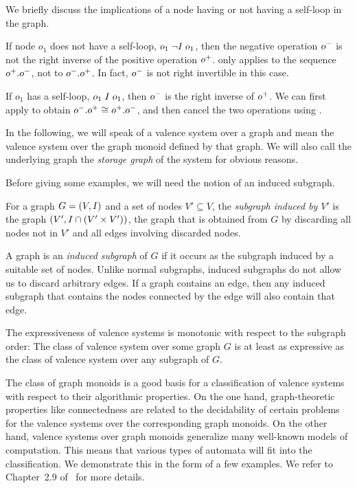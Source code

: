 \documentclass[../../diss.tex]{subfiles}
\begin{document}
\begin{remark}%
\label{Remark:ValenceSelfLoops}%
    We briefly discuss the implications of a node having or not having a self-loop in the graph.

    If node $o_1$ does not have a self-loop, $o_1 \mathrel{\neg I} o_1$, then the negative operation ${o}^-$ is not the right inverse of the positive operation ${o}^+$.
    \RuleCancel only applies to the sequence ${o}^+.{o}^-$, not to ${o}^-.{o}^+$.
    In fact, ${o}^-$ is not right invertible in this case.

    If $o_1$ has a self-loop, $o_1 \mathrel{I} o_1$, then ${o}^-$ is the right inverse of ${o}^+$.
    We can first apply \RuleSwap to obtain ${o}^-.{o}^+ \cong {o}^+.{o}^-$, and then cancel the two operations using \RuleCancel.
\end{remark}

In the following, we will speak of a valence system over a graph and mean the valence system over the graph monoid defined by that graph.
We will also call the underlying graph the \emph{storage graph} of the system for obvious reasons.

Before giving some examples, we will need the notion of an induced subgraph.

\begin{definition}
    For a graph $G = (V,I)$ and a set of nodes $V' \subseteq V$, the \emph{subgraph induced by $V'$} is the graph $(V', I \cap (V' \times V'))$, \ie the graph that is obtained from $G$ by discarding all nodes not in $V'$ and all edges involving discarded nodes.
\end{definition}

A graph is an \emph{induced subgraph} of $G$ if it occurs as the subgraph induced by a suitable set of nodes.
Unlike normal subgraphs, induced subgraphs do not allow us to discard arbitrary edges.
If a graph contains an edge, then any induced subgraph that contains the nodes connected by the edge will also contain that edge.

The expressiveness of valence systems is monotonic with respect to the subgraph order:
The class of valence system over some graph $G$ is at least as expressive as the class of valence system over any subgraph of $G$.

The class of graph monoids is a good basis for a classification of valence systems with respect to their algorithmic properties.
On the one hand, graph-theoretic properties like connectedness are related to the decidability of certain problems for the valence systems over the corresponding graph monoids.
On the other hand, valence systems over graph monoids generalize many well-known models of computation.
This means that various types of automata will fit into the classification.
We demonstrate this in the form of a few examples.
We refer to Chapter~2.9 of~\cite{Zetzsche15d} for more details.
\end{document}
